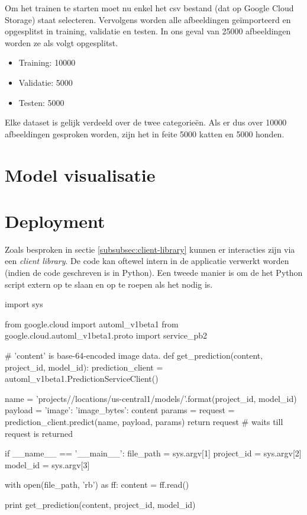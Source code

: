 Om het trainen te starten moet nu enkel het csv bestand (dat op Google Cloud Storage) staat selecteren. Vervolgens worden alle afbeeldingen geïmporteerd en opgesplitst in training, validatie en testen. In ons geval van 25000 afbeeldingen worden ze als volgt opgesplitst.

\begin{itemize}
    \item Training: 10000
    \item Validatie: 5000
    \item Testen: 5000
\end{itemize}

Elke dataset is gelijk verdeeld over de twee categorieën. Als er dus over 10000 afbeeldingen gesproken worden, zijn het in feite 5000 katten en 5000 honden.

\section{Model visualisatie}
\label{sec:google-automl-visualisation}

\section{Deployment}
\label{sec:google-automl-deployment}

Zoals besproken in sectie \ref{subsubsec:client-library} kunnen er interacties zijn via een \textit{client library}. De code kan oftewel intern in de applicatie verwerkt worden (indien de code geschreven is in Python). Een tweede manier is om de het Python script extern op te slaan en op te roepen als het nodig is.

\bigskip

\begin{python}
import sys

from google.cloud import automl_v1beta1
from google.cloud.automl_v1beta1.proto import service_pb2


# 'content' is base-64-encoded image data.
def get_prediction(content, project_id, model_id):
    prediction_client = automl_v1beta1.PredictionServiceClient()
    
    name = 'projects/{}/locations/us-central1/models/{}'.format(project_id, model_id)
    payload = {'image': {'image_bytes': content }}
    params = {}
    request = prediction_client.predict(name, payload, params)
    return request  # waits till request is returned

if __name__ == '__main__':
    file_path = sys.argv[1]
    project_id = sys.argv[2]
    model_id = sys.argv[3]

    with open(file_path, 'rb') as ff:
        content = ff.read()
    
    print get_prediction(content, project_id, model_id)
\end{python}

